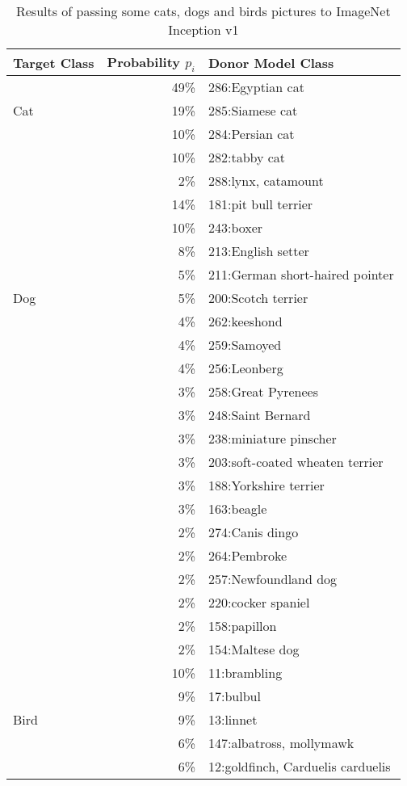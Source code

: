 \begin{table*}\caption{Results of passing some cats, dogs and birds pictures to ImageNet Inception v1}\label{table:inception_cats}
\begin{adjustwidth}{-2in}{-2in} %
\centering
\begin{tabular}{@{}lrl@{}}
\toprule
Target Class & Probability \(p_i\) & Donor Model Class \\
\midrule
\multirow{3}{*}{Cat} & 49\% & 286:Egyptian cat \\
 & 19\% & 285:Siamese cat \\
 & 10\% & 284:Persian cat \\
 & 10\% & 282:tabby cat \\
 & 2\% & 288:lynx, catamount \\
\midrule
\multirow{9}{*}{Dog} & 14\% & 181:pit bull terrier \\
 & 10\% & 243:boxer \\
 & 8\% & 213:English setter \\
 & 5\% & 211:German short-haired pointer \\
 & 5\% & 200:Scotch terrier \\
 & 4\% & 262:keeshond \\
 & 4\% & 259:Samoyed \\
 & 4\% & 256:Leonberg \\
 & 3\% & 258:Great Pyrenees \\
 & 3\% & 248:Saint Bernard \\
 & 3\% & 238:miniature pinscher \\
 & 3\% & 203:soft-coated wheaten terrier \\
 & 3\% & 188:Yorkshire terrier \\
 & 3\% & 163:beagle \\
 & 2\% & 274:Canis dingo \\
 & 2\% & 264:Pembroke \\
 & 2\% & 257:Newfoundland dog \\
 & 2\% & 220:cocker spaniel \\
 & 2\% & 158:papillon \\
 & 2\% & 154:Maltese dog \\
\midrule
\multirow{9}{*}{Bird} & 10\% & 11:brambling \\
 & 9\% & 17:bulbul \\
 & 9\% & 13:linnet \\
 & 6\% & 147:albatross, mollymawk \\
 & 6\% & 12:goldfinch, Carduelis carduelis \\

\end{tabular}
\end{adjustwidth}
\end{table*}
